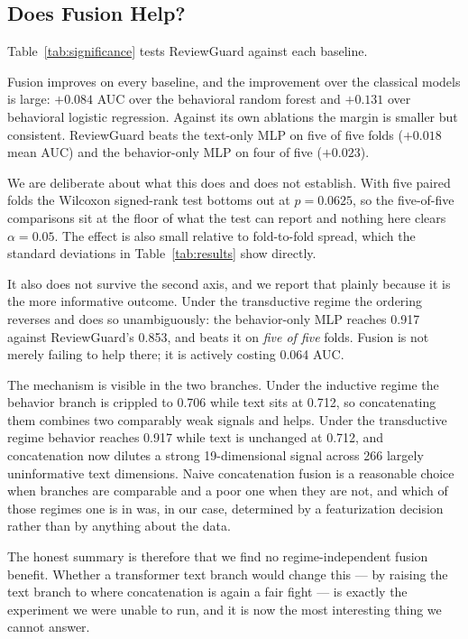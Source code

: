 \documentclass[conference]{IEEEtran}
\begin{document}
\subsection{Does Fusion Help?}

Table~\ref{tab:significance} tests ReviewGuard against each baseline.



Fusion improves on every baseline, and the improvement over the classical
models is large: $+0.084$ AUC over the behavioral random forest and $+0.131$
over behavioral logistic regression. Against its own ablations the margin is
smaller but consistent. ReviewGuard beats the text-only MLP on five of five
folds ($+0.018$ mean AUC) and the behavior-only MLP on four of five ($+0.023$).

We are deliberate about what this does and does not establish. With five paired
folds the Wilcoxon signed-rank test bottoms out at $p = 0.0625$, so the
five-of-five comparisons sit at the floor of what the test can report and
nothing here clears $\alpha = 0.05$. The effect is also small relative to
fold-to-fold spread, which the standard deviations in Table~\ref{tab:results}
show directly.

It also does not survive the second axis, and we report that plainly because it
is the more informative outcome. Under the transductive regime the ordering
reverses and does so unambiguously: the behavior-only MLP reaches 0.917 against
ReviewGuard's 0.853, and beats it on \textit{five of five} folds. Fusion is not
merely failing to help there; it is actively costing 0.064 AUC.

The mechanism is visible in the two branches. Under the inductive regime the
behavior branch is crippled to 0.706 while text sits at 0.712, so concatenating
them combines two comparably weak signals and helps. Under the transductive
regime behavior reaches 0.917 while text is unchanged at 0.712, and
concatenation now dilutes a strong 19-dimensional signal across 266 largely
uninformative text dimensions. Naive concatenation fusion is a reasonable choice
when branches are comparable and a poor one when they are not, and which of
those regimes one is in was, in our case, determined by a featurization decision
rather than by anything about the data.

The honest summary is therefore that we find no regime-independent fusion
benefit. Whether a transformer text branch would change this --- by raising the
text branch to where concatenation is again a fair fight --- is exactly the
experiment we were unable to run, and it is now the most interesting thing we
cannot answer.
\end{document}
